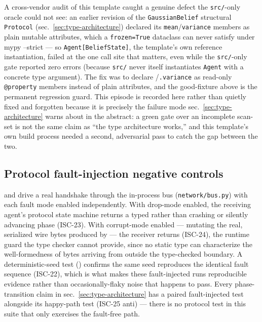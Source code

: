 \documentclass[
  english,
]{article}
\theoremstyle{definition}
\begin{document}
A cross-vendor audit of this template caught a genuine defect the
\texttt{src/}-only oracle could not see: an earlier revision of the
\texttt{GaussianBelief} structural \texttt{Protocol}
(sec.~\ref{sec:type-architecture}) declared its
\texttt{mean}/\texttt{variance} members as plain mutable attributes,
which a \texttt{frozen=True} dataclass can never satisfy under mypy
--strict --- so \texttt{Agent{[}BeliefState{]}}, the template's own
reference instantiation, failed  at the one
call site that matters, even while the \texttt{src/}-only gate reported
zero errors (because \texttt{src/} never itself instantiates
\texttt{Agent} with a concrete type argument). The fix was to declare
/\texttt{.variance} as read-only
\texttt{@property} members instead of plain attributes, and the
good-fixture above is the permanent regression guard. This episode is
recorded here rather than quietly fixed and forgotten because it is
precisely the failure mode sec.~\ref{sec:type-architecture} warns about
in the abstract: a green gate over an incomplete scan-set is not the
same claim as ``the type architecture works,'' and this template's own
build process needed a second, adversarial pass to catch the gap between
the two.

\subsection{Protocol fault-injection negative
controls}\label{protocol-fault-injection-negative-controls}

 and
 drive a real
handshake through the in-process bus (\texttt{network/bus.py}) with each
fault mode enabled independently. With drop-mode enabled, the receiving
agent's protocol state machine returns a typed
 rather than crashing or
silently advancing phase (ISC-23). With corrupt-mode enabled ---
mutating the real, serialized wire bytes produced by
 --- the receiver returns
 (ISC-24), the runtime guard
the type checker cannot provide, since no static type can characterize
the well-formedness of bytes arriving from outside the type-checked
boundary. A deterministic-seed test
()
confirms the same seed reproduces the identical fault sequence (ISC-22),
which is what makes these fault-injected runs reproducible evidence
rather than occasionally-flaky noise that happens to pass. Every
phase-transition claim in sec.~\ref{sec:type-architecture} has a paired
fault-injected test alongside its happy-path test (ISC-25 anti) ---
there is no protocol test in this suite that only exercises the
fault-free path.
\end{document}
